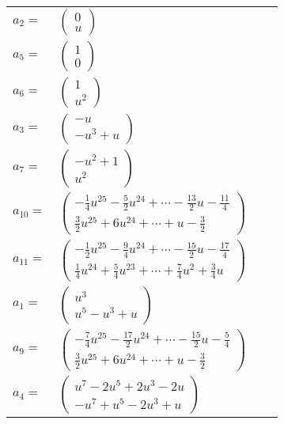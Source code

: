 \documentclass[1p]{elsarticle_modified}
\theoremstyle{definition}
\begin{document}
\begin{tabular}{m{7pt} m{180pt} m{7pt} m{180pt} }
\flushright $a_{2}=$&$\begin{pmatrix}0\\u\end{pmatrix}$ \\
\flushright $a_{5}=$&$\begin{pmatrix}1\\0\end{pmatrix}$ \\
\flushright $a_{6}=$&$\begin{pmatrix}1\\u^2\end{pmatrix}$ \\
\flushright $a_{3}=$&$\begin{pmatrix}- u\\- u^3+u\end{pmatrix}$ \\
\flushright $a_{7}=$&$\begin{pmatrix}- u^2+1\\u^2\end{pmatrix}$ \\
\flushright $a_{10}=$&$\begin{pmatrix}-\frac{1}{4} u^{25}-\frac{5}{2} u^{24}+\cdots-\frac{13}{2} u-\frac{11}{4}\\\frac{3}{2} u^{25}+6 u^{24}+\cdots+u-\frac{3}{2}\end{pmatrix}$ \\
\flushright $a_{11}=$&$\begin{pmatrix}-\frac{1}{2} u^{25}-\frac{9}{4} u^{24}+\cdots-\frac{15}{2} u-\frac{17}{4}\\\frac{1}{4} u^{24}+\frac{5}{4} u^{23}+\cdots+\frac{7}{4} u^2+\frac{3}{4} u\end{pmatrix}$ \\
\flushright $a_{1}=$&$\begin{pmatrix}u^3\\u^5- u^3+u\end{pmatrix}$ \\
\flushright $a_{9}=$&$\begin{pmatrix}-\frac{7}{4} u^{25}-\frac{17}{2} u^{24}+\cdots-\frac{15}{2} u-\frac{5}{4}\\\frac{3}{2} u^{25}+6 u^{24}+\cdots+u-\frac{3}{2}\end{pmatrix}$ \\
\flushright $a_{4}=$&$\begin{pmatrix}u^7-2 u^5+2 u^3-2 u\\- u^7+u^5-2 u^3+u\end{pmatrix}$ \\

\end{tabular}
\end{document}
